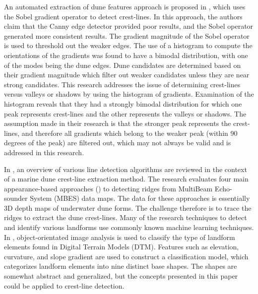 An automated extraction of dune features approach is proposed in \cite{2015_automated_mapping_of_linear_dunefield}, which uses the Sobel gradient operator to detect crest-lines. In this approach, the authors claim that the Canny edge detector provided poor results, and the Sobel operator generated more consistent results. The gradient magnitude of the Sobel operator is used to threshold out the weaker edges. The use of a histogram to compute the orientations of the gradients was found to have a bimodal distribution, with one of the modes being the dune edges. Dune candidates are determined based on their gradient magnitude which filter out weaker candidates unless they are near strong candidates. This research addresses the issue of determining crest-lines versus valleys or shadows by using the histogram of gradients. Examination of the histogram reveals that they had a strongly bimodal distribution for which one peak represents crest-lines and the other represents the valleys or shadows. The assumption made in their research is that the stronger peak represents the crest-lines, and therefore all gradients which belong to the weaker peak (within 90 degrees of the peak) are filtered out, which may not always be valid and is addressed in this research.

In \cite{2016_comparisons_crest_line_extraction_marine_dunes}, an overview of various line detection algorithms are reviewed in the context of a marine dune crest-line extraction method. The research evaluates four main appearance-based approaches (\cite{2005_topology_driven_algorithms_for_ridge_extraction,2005_smooth_feature_lines_surface_meshes,2004_ridge_valley_lines_meshes_surface_fitting}) to detecting ridges from MultiBeam Echo-sounder System (MBES) data maps. The data for these approaches is essentially 3D depth maps of underwater dune forms. The challenge therefore is to trace the ridges to extract the dune crest-lines. Many of the research techniques to detect and identify various landforms use commonly known machine learning techniques. In \cite{2006_automated_classification_landform_elements}, object-orientated image analysis is used to classify the type of landform elements found in Digital Terrain Models (DTM). Features such as elevation, curvature, and slope gradient are used to construct a classification model, which categorizes landform elements into nine distinct base shapes. The shapes are somewhat abstract and generalized, but the concepts presented in this paper could be applied to crest-line detection.

